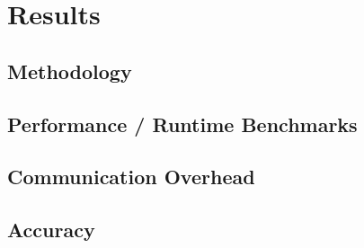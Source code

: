 \chapter{Results}
\section{Methodology}
\section{Performance / Runtime Benchmarks}
\section{Communication Overhead}
\section{Accuracy}
